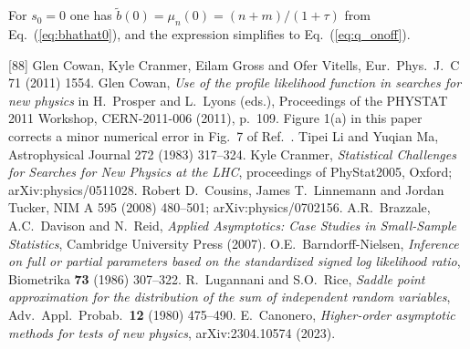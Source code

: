 \documentclass[11pt]{article}
\begin{document}
\noindent For $s_0 = 0$ one has $\tilde{b}(0) = \mu_n(0) =
(n+m)/(1+\tau)$ from Eq.~(\ref{eq:bhathat0}), and the expression
simplifies to Eq.~(\ref{eq:q_onoff}).

\begin{thebibliography}{[88]}
 Glen Cowan, Kyle Cranmer, Eilam Gross and Ofer Vitells,
Eur.\ Phys.\ J.\ C 71 (2011) 1554.
 Glen Cowan, {\it Use of the profile
likelihood function in searches for new physics} in 
H.~Prosper and L.~Lyons (eds.), 
Proceedings of the PHYSTAT 2011 Workshop, CERN-2011-006 (2011), p.~109.
Figure 1(a) in this paper corrects a minor numerical error in
Fig.~7 of Ref.~\cite{asimov}.
 Tipei Li and Yuqian Ma, Astrophysical Journal 272
  (1983) 317--324.
  Kyle Cranmer, {\it 
Statistical Challenges for Searches for New Physics at the LHC}, 
proceedings of PhyStat2005, Oxford; arXiv:physics/0511028.
 Robert D.~Cousins, James T.~Linnemann and Jordan Tucker,
NIM A 595 (2008) 480--501; arXiv:physics/0702156.
 A.R.\ Brazzale, A.C.\ Davison and N.\ Reid,
  {\it Applied Asymptotics: Case Studies in Small-Sample Statistics},
  Cambridge University Press (2007).
 O.E.\ Barndorff-Nielsen,
  {\it Inference on full or partial parameters based on the
  standardized signed log likelihood ratio},
  Biometrika {\bf 73} (1986) 307--322.
 R.\ Lugannani and S.O.\ Rice,
  {\it Saddle point approximation for the distribution of the sum of
  independent random variables},
  Adv.\ Appl.\ Probab.\ {\bf 12} (1980) 475--490.
 E.\ Canonero,
  {\it Higher-order asymptotic methods for tests of new physics},
  arXiv:2304.10574 (2023).
\end{thebibliography}
\end{document}
